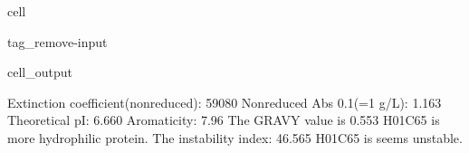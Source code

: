 \documentclass[letterpaper,10pt,english]{jupyterBook}
\begin{document}
\begin{sphinxuseclass}{cell}
\begin{sphinxuseclass}{tag_remove-input}
\begin{sphinxVerbatimOutput}
\begin{sphinxuseclass}{cell_output}
\begin{sphinxVerbatim}[commandchars=\\\{\}]
\PYGZsh{} Extinction coefficient(non\PYGZhy{}reduced): \PYGZhy{}\PYGZhy{}\PYGZhy{}\PYGZhy{}\PYGZhy{}\PYGZhy{}\PYGZhy{}\PYGZhy{}\PYGZhy{}\PYGZhy{}\PYGZhy{}\PYGZhy{}\PYGZhy{}\PYGZhy{}\PYGZhy{}\PYGZhy{}\PYGZhy{}\PYGZhy{}\PYGZhy{}\PYGZhy{}\PYGZhy{}\PYGZhy{}59080
\PYGZsh{} Non\PYGZhy{}reduced Abs 0.1\PYGZpc{}(=1 g/L): \PYGZhy{}\PYGZhy{}\PYGZhy{}\PYGZhy{}\PYGZhy{}\PYGZhy{}\PYGZhy{}\PYGZhy{}\PYGZhy{}\PYGZhy{}\PYGZhy{}\PYGZhy{}\PYGZhy{}\PYGZhy{}\PYGZhy{}\PYGZhy{}\PYGZhy{}\PYGZhy{}\PYGZhy{}\PYGZhy{}\PYGZhy{}\PYGZhy{}\PYGZhy{}\PYGZhy{}\PYGZhy{}\PYGZhy{}\PYGZhy{}\PYGZhy{}\PYGZhy{}1.163
\PYGZsh{} Theoretical pI: \PYGZhy{}\PYGZhy{}\PYGZhy{}\PYGZhy{}\PYGZhy{}\PYGZhy{}\PYGZhy{}\PYGZhy{}\PYGZhy{}\PYGZhy{}\PYGZhy{}\PYGZhy{}\PYGZhy{}\PYGZhy{}\PYGZhy{}\PYGZhy{}\PYGZhy{}\PYGZhy{}\PYGZhy{}\PYGZhy{}\PYGZhy{}\PYGZhy{}\PYGZhy{}\PYGZhy{}\PYGZhy{}\PYGZhy{}\PYGZhy{}\PYGZhy{}\PYGZhy{}\PYGZhy{}\PYGZhy{}\PYGZhy{}\PYGZhy{}\PYGZhy{}\PYGZhy{}\PYGZhy{}\PYGZhy{}\PYGZhy{}\PYGZhy{}\PYGZhy{}\PYGZhy{}\PYGZhy{}\PYGZhy{}6.660
\PYGZsh{} Aromaticity: \PYGZhy{}\PYGZhy{}\PYGZhy{}\PYGZhy{}\PYGZhy{}\PYGZhy{}\PYGZhy{}\PYGZhy{}\PYGZhy{}\PYGZhy{}\PYGZhy{}\PYGZhy{}\PYGZhy{}\PYGZhy{}\PYGZhy{}\PYGZhy{}\PYGZhy{}\PYGZhy{}\PYGZhy{}\PYGZhy{}\PYGZhy{}\PYGZhy{}\PYGZhy{}\PYGZhy{}\PYGZhy{}\PYGZhy{}\PYGZhy{}\PYGZhy{}\PYGZhy{}\PYGZhy{}\PYGZhy{}\PYGZhy{}\PYGZhy{}\PYGZhy{}\PYGZhy{}\PYGZhy{}\PYGZhy{}\PYGZhy{}\PYGZhy{}\PYGZhy{}\PYGZhy{}\PYGZhy{}\PYGZhy{}\PYGZhy{}\PYGZhy{}\PYGZhy{}7.96\PYGZpc{}
\PYGZsh{} The GRAVY value is \PYGZhy{}\PYGZhy{}\PYGZhy{}\PYGZhy{}\PYGZhy{}\PYGZhy{}\PYGZhy{}\PYGZhy{}\PYGZhy{}\PYGZhy{}\PYGZhy{}\PYGZhy{}\PYGZhy{}\PYGZhy{}\PYGZhy{}\PYGZhy{}\PYGZhy{}\PYGZhy{}\PYGZhy{}\PYGZhy{}\PYGZhy{}\PYGZhy{}\PYGZhy{}\PYGZhy{}\PYGZhy{}\PYGZhy{}\PYGZhy{}\PYGZhy{}\PYGZhy{}\PYGZhy{}\PYGZhy{}\PYGZhy{}\PYGZhy{}\PYGZhy{}\PYGZhy{}\PYGZhy{}\PYGZhy{}\PYGZhy{}\PYGZhy{}\PYGZhy{}0.553
  H\PYGZus{}01C65 is more hydrophilic protein.
\PYGZsh{} The instability index: \PYGZhy{}\PYGZhy{}\PYGZhy{}\PYGZhy{}\PYGZhy{}\PYGZhy{}\PYGZhy{}\PYGZhy{}\PYGZhy{}\PYGZhy{}\PYGZhy{}\PYGZhy{}\PYGZhy{}\PYGZhy{}\PYGZhy{}\PYGZhy{}\PYGZhy{}\PYGZhy{}\PYGZhy{}\PYGZhy{}\PYGZhy{}\PYGZhy{}\PYGZhy{}\PYGZhy{}\PYGZhy{}\PYGZhy{}\PYGZhy{}\PYGZhy{}\PYGZhy{}\PYGZhy{}\PYGZhy{}\PYGZhy{}\PYGZhy{}\PYGZhy{}\PYGZhy{}46.565
  H\PYGZus{}01C65 is seems unstable.
\end{sphinxVerbatim}

\end{sphinxuseclass}\end{sphinxVerbatimOutput}

\end{sphinxuseclass}
\end{sphinxuseclass}
\end{document}
